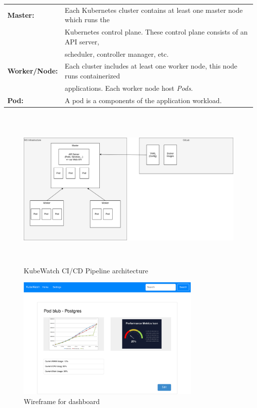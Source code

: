 \begin{tabular}{ll}
  \textbf{Master:}        & Each Kubernetes cluster contains at least one master node which runs the \\ 
                          & Kubernetes control plane. These control plane consists of an API server, \\
                          & scheduler, controller manager, etc. \\
  \textbf{Worker/Node:}   & Each cluster includes at least one worker node, this node runs containerized \\
                          & applications. Each worker node host \textit{Pods}. \\
  \textbf{Pod:}           & A pod is a components of the application workload. \\
\end{tabular}

\begin{figure}[h]
  \centering
  \caption{KubeWatch CI/CD Pipeline architecture}
  \label{fig:architecture}
  \includegraphics[height=8cm]{resources/architecture.png}
\end{figure}

\begin{figure}[h]
  \centering
  \caption{\label{fig:wireframe-dashboard}Wireframe for dashboard}
  \includegraphics[height=6cm]{resources/wireframe_kubewatch-Dashboard.png}
\end{figure}


